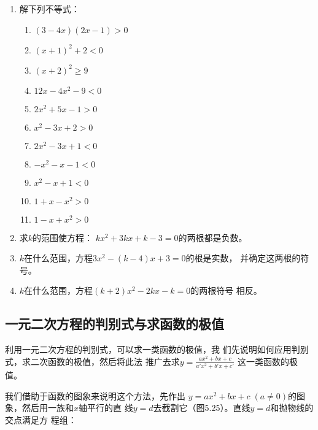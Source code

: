\begin{ex}
\begin{enumerate}
    \item 解下列不等式：
\begin{multicols}{2}
\begin{enumerate}
    \item $(3-4x)(2x-1)>0$
    \item $(x+1)^2+2<0$
    \item $(x+2)^2\ge 9$
    \item $12x-4x^2-9<0$
    \item $2x^2+5x-1>0$
    \item $x^2-3x+2>0$
    \item $2x^2-3x+1<0$
    \item $-x^2-x-1<0$
    \item $x^2-x+1<0$
    \item $1+x-x^2>0$
    \item $1-x+x^2>0$
\end{enumerate}
\end{multicols}

\item 求$k$的范围使方程：
$kx^2+3kx+k-3=0$的两根都是负数。
\item $k$在什么范围，方程$3x^2-(k-4)x+3=0$的根是实数，
并确定这两根的符号。
\item $k$在什么范围，方程$(k+2)x^2-2kx-k=0$的两根符号
相反。
\end{enumerate}    
\end{ex}

\subsection{一元二次方程的判别式与求函数的极值}
利用一元二次方程的判别式，可以求一类函数的极值，我
们先说明如何应用判别式，求二次函数的极值，然后将此法
推广去求$y=\frac{ax^2+bx+c}{a'x^2+b'x+c'}$
这一类函数的极值。

我们借助于函数的图象来说明这个方法，先作出
$y=ax^2+bx+c\; (a\ne 0)$的图象，然后用一族和$x$轴平行的直
线$y=d$去截割它（图5.25）。直线$y=d$和抛物线的交点满足方
程组：

